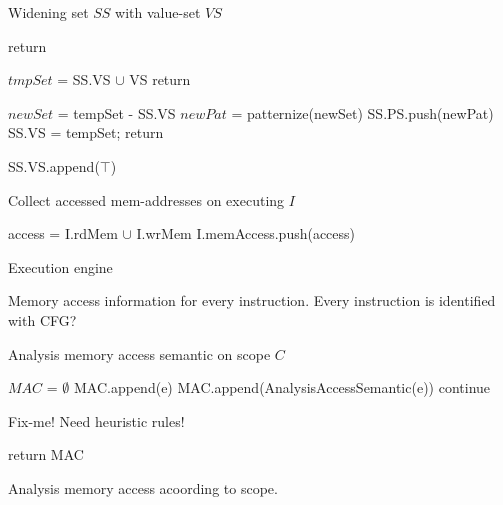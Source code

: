 \begin{algorithm}
  \caption{Widening set $SS$ with value-set $VS$}
  \footnotesize
  \begin{algorithmic}[1]
    \State return  
    \EndIf

    \State
    \State $tmpSet$ = SS.VS $\cup$ VS
    \State return 
    \EndIf

    \State
    \State $newSet$ = tempSet - SS.VS
    \State $newPat$ = patternize(newSet) 
    \State SS.PS.push(newPat)
    \State SS.VS = tempSet;
     
    \State return
    \EndIf

    \State
     
    \State SS.VS.append($\top$)
    \EndIf

    \EndFunction
  \end{algorithmic}
\end{algorithm}

\begin{algorithm}
  \caption{Collect accessed mem-addresses on executing $I$}
  \footnotesize
  \begin{algorithmic}[1]

     
    \State access = I.rdMem $\cup$ I.wrMem
    \State I.memAccess.push(access)

    \EndFunction
  \end{algorithmic}
\end{algorithm}


Execution engine

Memory access information for every instruction.
Every instruction is identified with CFG?


\begin{algorithm}
  \caption{Analysis memory access semantic on scope $C$}
  \footnotesize
  \begin{algorithmic}[1]

    \State $MAC$ = $\emptyset$
    \State MAC.append(e)
    \State MAC.append(AnalysisAccessSemantic(e))
    \Else
    \State continue
    \EndIf
    \EndFor

    \State
    \State Fix-me! Need heuristic rules!

    \State
    \State return MAC
    \EndFunction
  \end{algorithmic}
\end{algorithm}






Analysis memory access acoording to scope.



